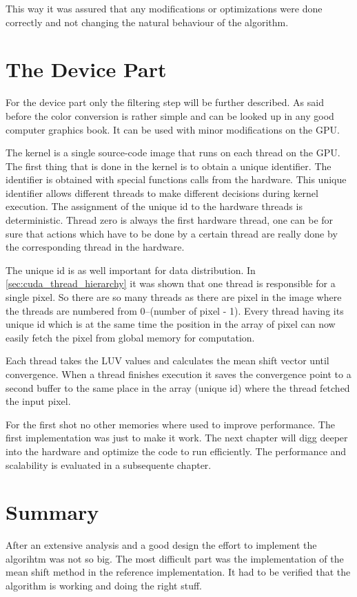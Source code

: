 This way it was assured that any modifications or optimizations were done 
correctly and not changing the natural behaviour of the algorithm. 

\section{The Device Part} %
\label{sec:the_device}
For the device part only the filtering step will be further described. As said
before the color conversion is rather simple and can be looked up in any good
computer graphics book. It can be used with minor modifications on the \gls{GPU}. 

The kernel is a single source-code image that runs on each thread on the \gls{GPU}.
The first thing that is done in the kernel is to obtain a unique identifier. 
The identifier is obtained with special functions calls from the hardware. This
unique identifier allows different threads to make different decisions during
kernel execution. The assignment of the unique id to the hardware threads is
deterministic. Thread zero is always the first hardware thread, one can be for
sure that actions which have to be done by a certain thread are really done
by the corresponding thread in the hardware. 

The unique id is as well important for data distribution. 
In \autoref{sec:cuda_thread_hierarchy} it was shown that one thread is responsible
for a single pixel. So there are so many threads as there are pixel in the image 
where the threads are numbered from 0--(number of pixel - 1). Every thread having
its unique id which is at the same time the position in the array of pixel can
now easily fetch the pixel from global memory for computation. 

Each thread takes the \gls{LUV} values and calculates the mean shift vector 
until convergence. When a thread finishes execution it saves the convergence 
point to a second buffer to the same place in the array (unique id) where the 
thread fetched the input pixel. 

For the first shot no other memories where used to improve performance. The first
implementation was just to make it work. The next chapter will digg deeper into
the hardware and optimize the code to run efficiently. The performance
and scalability is evaluated in a subsequente chapter. 

\section{Summary} %
\label{sec:summary}
After an extensive analysis and a good design the effort to implement the algorihtm
was not so big. The most difficult part was the implementation of the
mean shift method in the reference implementation. It had to be verified that
the algorithm is working and doing the right stuff. 

